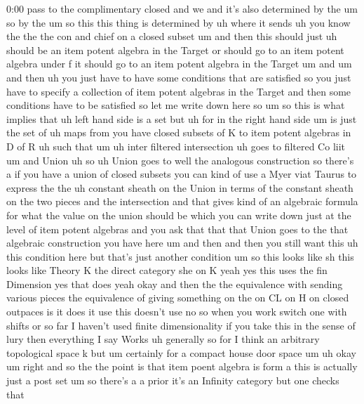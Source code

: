 \begin{unfinished}{0:00}
pass  to  the  complimentary  closed  and  we
and  it's  also  determined  by  the  um
so  by  the  um  so  this  this  thing  is
determined  by  uh  where  it
sends  uh  you  know  the  the  the  con  and
chief  on  a  closed
subset  um  and  then  this  should  just  uh
should  be  an  item  potent
algebra  in  the
Target  or  should  go  to  an  item  potent
algebra  under  f  it  should  go  to  an  item
potent  algebra  in  the
Target  um  and
um  and  then  uh  you  just  have  to  have
some  conditions  that  are  satisfied  so
you  just  have  to  specify  a  collection  of
item  potent  algebras  in  the  Target  and
then  some  conditions  have  to  be
satisfied  so  let  me  write  down  here  so
um  so  this  is  what  implies  that  uh  left
hand  side  is  a
set  but  uh  for  in  the  right  hand  side  um
is  just  the  set  of  uh  maps  from  you  have
closed  subsets  of  K  to  item  potent
algebras  in  D  of  R  uh
such  that  um  uh  inter  filtered
intersection  uh  goes  to  filtered  Co
liit  um  and
Union  uh  so
uh  Union  goes  to  well  the  analogous
construction  so  there's  a  if  you  have  a
union  of  closed  subsets  you  can  kind  of
use  a  Myer  viat  Taurus  to  express  the
the  uh  constant  sheath  on  the  Union  in
terms  of  the  constant  sheath  on  the  two
pieces  and  the  intersection  and  that
gives  kind  of  an  algebraic  formula  for
what  the  value  on  the  union  should  be
which  you  can  write  down  just  at  the
level  of  item  potent  algebras  and  you
ask  that  that  that  Union  goes  to  the
that  algebraic  construction  you  have
here
um  and  then  and  then  you  still  want  this
uh  this  condition  here  but  that's  just
another
condition  um
so  this  looks  like
sh  this  looks  like
Theory
K  the  direct  category  she  on  K  yeah  yes
this  uses  the  fin  Dimension  yes  that
does  yeah  okay  and  then
the  the  equivalence  with  sending  various
pieces  the  equivalence  of  giving
something  on  the  on  CL  on  H  on  closed
outpaces  is  it  does  it  use  this  doesn't
use  no  so  when  you  work  switch  one  with
shifts  or  so  far  I  haven't  used  finite
dimensionality  if  you  take  this  in  the
sense  of  lury  then  everything  I  say
Works  uh
generally  so  for  I  think  an  arbitrary
topological  space  k  but  um  certainly  for
a  compact  house  door  space
um
uh  okay  um  right  and  so  the  the  point  is
that  item  poent  algebra  is  form  a  this
is  actually  just  a  post
set  um  so  there's  a  a  prior  it's  an
Infinity  category  but  one  checks  that

\end{unfinished}
